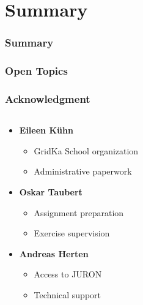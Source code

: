 \documentclass[aspectratio=169]{beamer}
\begin{document}
\section{Summary}
\label{sec:summary}


\begin{frame}
\frametitle{Summary}
\end{frame}

\begin{frame}
\frametitle{Open Topics}
\end{frame}

\begin{frame}
\frametitle{Acknowledgment}

\begin{columns}
    \begin{column}{0.48\textwidth}
        \begin{itemize}
            \item \textbf{Eileen Kühn}
            \begin{itemize}
                \item GridKa School organization
                \item Administrative paperwork
            \end{itemize}
            \item \textbf{Oskar Taubert}
            \begin{itemize}
                \item Assignment preparation
                \item Exercise supervision
            \end{itemize}
            \item \textbf{Andreas Herten}
            \begin{itemize}
                \item Access to JURON
                \item Technical support
            \end{itemize}
        \end{itemize}
    \end{column}


\end{columns}
\end{frame}
\end{document}
